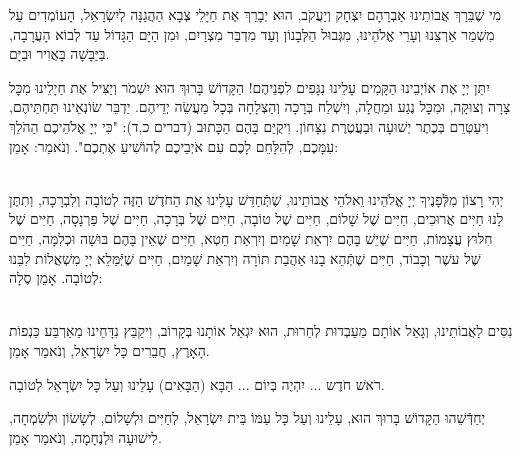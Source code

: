 \documentclass[twoside, openany, parskip=half, 11pt]{book}
\begin{document}
מִי שֶׁבֵּרַךְ אֲבוֹתֵינוּ
אַבְרָהָם יִצְחָק וְיַעֲקֹב,
הוּא יְבָרֵךְ אֶת חַיָּלֵי צְבָא הַהֲגַנָּה לְיִשְׂרָאֵל,
הָעוֹמְדִים עַל מִשְׁמַר אַרְצֵנוּ וְעָרֵי אֱלֹהֵינוּ,
מִגְּבוּל הַלְּבָנוֹן וְעַד מִדְבַּר מִצְרַיִם,
וּמִן הַיָּם הַגָּדוֹל עַד לְבוֹא הָעֲרָבָה,
בַּיַּבָּשָׁה בָּאֲוִיר וּבַיָּם.

יִתֵּן יְיָ אֶת אוֹיְבֵינוּ הַקָּמִים עָלֵינוּ
נִגָּפִים לִפְנֵיהֶם!
הַקָּדוֹשׁ בָּרוּךְ הוּא יִשְׁמֹר וְיַצִּיל אֶת חַיָלֵינוּ
מִכׇּל צָרָה וְצוּקָה,
וּמִכׇּל נֶגַע וּמַחֲלָה,
וְיִשְׁלַח בְּרָכָה וְהַצְלָחָה בְּכָל מַעֲשֵׂה יְדֵיהֶם.
יַדְבֵּר שׂוֹנְאֵינוּ תַּחְתֵּיהֶם,
וִיעַטְּרֵם בְּכֶתֶר יְשׁוּעָה וּבַעֲטֶרֶת נִצָּחוֹן.
וִיקֻיַּם בָּהֶם הַכָּתוּב (דברים כ,ד):
"כִּי יְיָ אֱלֹהֵיכֶם הַהֹלֵךְ עִמָּכֶם,
לְהִלָּחֵם לָכֶם עִם אֹיְבֵיכֶם
לְהוֹשִׁיעַ אֶתְכֶם".
וְנֹאמַר: אָמֵן:




\\
יְהִי רָצוֹן מִלְּֿפָנֶיךָ יְיָ אֱלֹהֵינוּ וֵאלֹהֵי אֲבוֹתֵינוּ,
שֶׁתְּֿחַדֵּשׁ עָלֵינוּ אֶת הַחֹדֶשׁ הַזֶּה לְטוֹבָה וְלִבְרָכָה,
וְתִתֶּן לָנוּ חַיִּים אֲרוּכִים,
חַיִּים שֶׁל שָׁלוֹם,
חַיִּים שֶׁל טוֹבָה,
חַיִּים שֶׁל בְּרָכָה,
חַיִּים שֶׁל פַּרְנָסָה,
חַיִּים שֶׁל חִלּוּץ עֲצָמוֹת,
חַיִּים שֶׁיֵשׁ בָּהֶם יִרְאַת שָׁמַיִם וְיִרְאַת חֵטְא,
חַיִּים שֶׁאֵין בָּהֶם בּוּשָׁה וּכְלִמָּה,
חַיִּים שֶׁל עשֶׁר וְכָבוֹד,
חַיִּים שֶׁתְּֿהֵא בָנוּ אַהֲבַת תּוֹרָה וְיִרְאַת שָׁמַיִם,
חַיִּים שֶׁיְּֿמַּלֵא יְיָ מִשְׁאֲלוֹת לִבֵּנוּ לְטוֹבָה. אָמֵן סֶלָה:

\\
 נִסִּים לַאֲבוֹתֵינוּ, וְגָאַל אוֹתָם מֵעַבְדוּת לְחֵרוּת, הוּא יִגְאַל אוֹתָנוּ בְּקָרוֹב, וִיקַבֵּץ נִדָּחֵינוּ מֵאַרְבַּע כַּנְפוֹת הָאָרֶץ, חֲבֵרִים כָּל יִשְׂרָאֵל, וְנֹאמַר אָמֵן.

רֹאשׁ חֹדֶש ... יִהְיֶה בְּיוֹם ... הַבָּא (הַבָּאִים) עָלֵינוּ וְעַל כָּל יִשְׂרָאֵל לְטוֹבָה.

יְחַדְּֿשֵׁהוּ הַקָּדוֹשׁ בָּרוּךְ הוּא, עָלֵינוּ וְעַל כָּל עַמּוֹ בֵּית יִשְׂרָאֵל, לְחַיִּים וּלְשָׁלוֹם, לְשָׂשׂוֹן וּלְשִׂמְחָה, לִישׁוּעָה וּלְנֶחָמָה, וְנֹאמַר אָמֵן.

\sepline

\vspace{-0.5\baselineskip}
\ashrei
\end{document}
